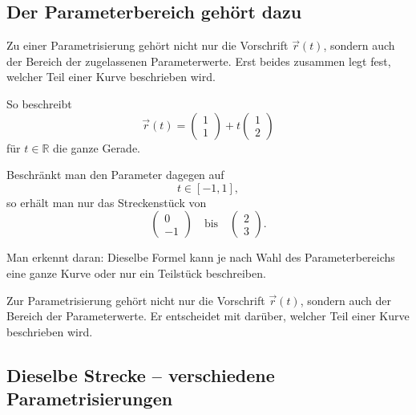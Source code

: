
\subsection{Der Parameterbereich gehört dazu}

Zu einer Parametrisierung gehört nicht nur die Vorschrift \(\vec r(t)\),
sondern auch der Bereich der zugelassenen Parameterwerte.
Erst beides zusammen legt fest,
welcher Teil einer Kurve beschrieben wird.

So beschreibt
\[
\vec r(t)=
\begin{pmatrix}
	1\\
	1
\end{pmatrix}
+t
\begin{pmatrix}
	1\\
	2
\end{pmatrix}
\]
für \(t\in\mathbb R\) die ganze Gerade.

Beschränkt man den Parameter dagegen auf
\[
t\in[-1,1],
\]
so erhält man nur das Streckenstück von
\[
\begin{pmatrix}
	0\\
	-1
\end{pmatrix}
\quad \text{bis} \quad
\begin{pmatrix}
	2\\
	3
\end{pmatrix}.
\]

Man erkennt daran:
Dieselbe Formel kann je nach Wahl des Parameterbereichs
eine ganze Kurve oder nur ein Teilstück beschreiben.

\begin{DidacticBox}
	Zur Parametrisierung gehört nicht nur die Vorschrift \(\vec r(t)\),
	sondern auch der Bereich der Parameterwerte.
	Er entscheidet mit darüber,
	welcher Teil einer Kurve beschrieben wird.
\end{DidacticBox}



\subsection{Dieselbe Strecke -- verschiedene Parametrisierungen}

